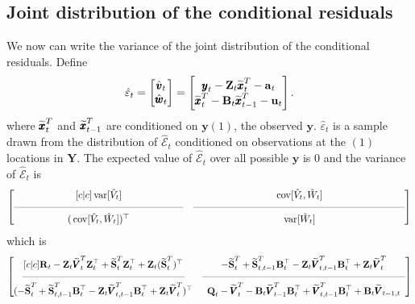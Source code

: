 \documentclass[]{article}
\def\UPS{\mbox{\boldmath $\Upsilon$}}
\def\XI{\mbox{\boldmath $\Xi$}}
\def\BB{\mbox{$\mathbf B$}}	\def\bb{\mbox{$\mathbf b$}} \def\Bb{\mbox{$\mathbf J$}} \def\Ba{\mbox{$\mathbf L$}} \def\Bm{\UPS}
\def\QQ{\mbox{$\mathbf Q$}}	 \def\qq{\mbox{$\mathbf q$}} \def\Qb{\mbox{$\mathbf G$}}  \def\Qm{\mathbb{Q}}
\def\RR{\mbox{$\mathbf R$}}	 \def\rr{\mbox{$\mathbf r$}} \def\Rb{\mbox{$\mathbf H$}}	\def\Rm{\mathbb{R}}
\def\Ss{\mbox{$\mathbf S$}}
\def\VV{\mbox{$\pmb{V}$}}	\def\vv{\mbox{$\pmb{v}$}}
\def\YY{\mbox{$\pmb{Y}$}}	\def\yy{\mbox{$\pmb{y}$}}
\def\ZZ{\mbox{$\mathbf Z$}}	\def\zz{\mbox{$\mathbf z$}}	\def\Zb{\mbox{$\mathbf M$}} \def\Za{\mbox{$\mathbf N$}} \def\Zm{\XI}
\def\var{\,\textup{\textrm{var}}}
\def\cov{\,\textup{\textrm{cov}}}
\def\hatxt{\widetilde{\xx}_t^T}
\def\hatxtm{\widetilde{\mbox{$\xx$}}_{t-1}^T}
\def\hatVt{\widetilde{\VV}_t^T}
\def\hatVtm{\widetilde{\VV}_{t-1}^T}
\def\hatVttm{\widetilde{\VV}_{t,t-1}^T}
\def\hatSt{\widetilde{\Ss}_t^T}
\def\hatSttm{\widetilde{\Ss}_{t,t-1}^T}
\begin{document}
\subsection{Joint distribution of the conditional residuals}
We now can write the variance of the joint distribution of the conditional residuals. Define
\begin{equation}
\hat{\varepsilon}_t = \begin{bmatrix}\hat{\vv}_t\\ \hat{\ww}_t\end{bmatrix} =
\begin{bmatrix}\yy_t - \ZZ_t\hatxt-\aa_t\\ \hatxt - \BB_t\hatxtm-\uu_t \end{bmatrix}.
\end{equation}
where $\hatxt$ and $\hatxtm$ are conditioned on $\yy{(1)}$, the observed $\yy$.
$\hat{\varepsilon}_t$ is a sample drawn from the distribution of $\hat{\mathcal{E}}_t$ conditioned on observations at the $(1)$ locations in $\YY$.  The expected value of $\hat{\mathcal{E}}_t$ over all possible $\yy$ is 0 and the variance of $\hat{\mathcal{E}}_t$  is
\begin{equation}
 \begin{bmatrix}[c|c]
 \var[\hat{V}_t]&
 \cov[\hat{V}_t, \hat{W}_t] \\
 \rule[.5ex]{40ex}{0.25pt} & \rule[.5ex]{50ex}{0.25pt} \\
 (\cov[\hat{V}_t, \hat{W}_t])^\top& 
 \var[\hat{W}_t] \end{bmatrix}
\end{equation}
which is
\begin{equation}\label{eqn:jointcondresid1general}
 \begin{bmatrix}[c|c]
 \RR_t - \ZZ_t \hatVt \ZZ_t^\top + \hatSt\ZZ_t^\top+\ZZ_t(\hatSt)^\top&
 - \hatSt + \hatSttm\BB_t^\top  - \ZZ_t\hatVttm\BB_t^\top + \ZZ_t\hatVt \\
 \rule[.5ex]{40ex}{0.25pt} & \rule[.5ex]{50ex}{0.25pt} \\
 (- \hatSt + \hatSttm\BB_t^\top  - \ZZ_t\hatVttm\BB_t^\top + \ZZ_t\hatVt)^\top& 
 \QQ_t - \hatVt - \BB_t \hatVtm \BB_t^\top + \hatVttm \BB_t^\top + \BB_t\widetilde{\VV}_{t-1,t} \end{bmatrix}
\end{equation}
\end{document}

